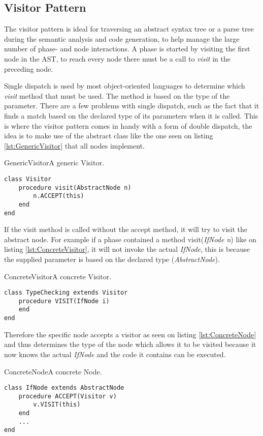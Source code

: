 \subsection{Visitor Pattern}
\label{sec:VisitorPattern}
The visitor pattern is ideal for traversing an abstract syntax tree or a parse tree during the semantic analysis and code generation, to help manage the large number of phase- and node interactions. A phase is started by visiting the first node in the AST, to reach every node there must be a call to \emph{visit} in the preceding node.

Single dispatch is used by most object-oriented languages to determine which \emph{visit} method that must be used. The method is based on the type of the parameter. There are a few problems with single dispatch, such as the fact that it finds a match based on the declared type of its parameters when it is called. This is where the visitor pattern comes in handy with a form of double dispatch, the idea is to make use of the abstract class like the one seen on listing \ref{lst:GenericVisitor} that all nodes implement.

\begin{code}{GenericVisitor}{A generic Visitor.}
\begin{lstlisting}
class Visitor
	procedure visit(AbstractNode n)
		n.ACCEPT(this)
	end
end
\end{lstlisting}
\end{code}

If the visit method is called without the accept method, it will try to visit the abstract node. For example if a phase contained a method visit(\textit{IfNode n}) like on listing \ref{lst:ConcreteVisitor}, it will not invoke the actual \textit{IfNode}, this is because the supplied parameter is based on the declared type (\textit{AbstractNode}).

\begin{code}{ConcreteVisitor}{A concrete Visitor.}
\begin{lstlisting}
class TypeChecking extends Visitor
	procedure VISIT(IfNode i)
	end
end
\end{lstlisting}
\end{code}

Therefore the specific node accepts a visitor as seen on listing \ref{lst:ConcreteNode} and thus determines the type of the node which allows it to be visited because it now knows the actual \textit{IfNode} and the code it contains can be executed.

\begin{code}{ConcreteNode}{A concrete Node.}
\begin{lstlisting}
class IfNode extends AbstractNode
	procedure ACCEPT(Visitor v)
		v.VISIT(this)
	end
	...
end
\end{lstlisting}
\end{code}